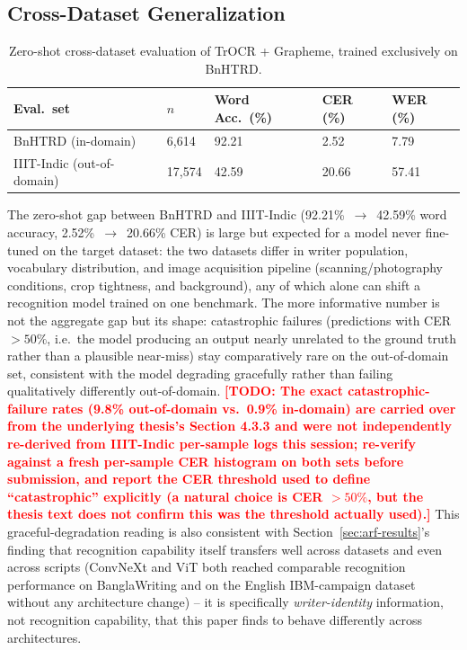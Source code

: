 \documentclass[a4paper,fleqn]{cas-dc}
\newcommand{\todo}[1]{\textcolor{red}{\textbf{[TODO: #1]}}}
\begin{document}
\subsection{Cross-Dataset Generalization}
\label{sec:cross-dataset}

\begin{table}[h]
\caption{Zero-shot cross-dataset evaluation of TrOCR + Grapheme, trained
exclusively on BnHTRD.}
\label{tab:cross-dataset}
\begin{tabular*}{\tblwidth}{@{}LLLLL@{}}
\toprule
Eval.\ set & $n$ & Word Acc.\ (\%) & CER (\%) & WER (\%) \\
\midrule
BnHTRD (in-domain) & 6{,}614 & 92.21 & 2.52 & 7.79 \\
IIIT-Indic (out-of-domain) & 17{,}574 & 42.59 & 20.66 & 57.41 \\
\bottomrule
\end{tabular*}
\end{table}

The zero-shot gap between BnHTRD and IIIT-Indic (92.21\%~$\to$~42.59\%
word accuracy, 2.52\%~$\to$~20.66\% CER) is large but expected for a model
never fine-tuned on the target dataset: the two datasets differ in writer
population, vocabulary distribution, and image acquisition pipeline
(scanning/photography conditions, crop tightness, and background), any of
which alone can shift a recognition model trained on one benchmark. The
more informative number is not the aggregate gap but its shape:
catastrophic failures (predictions with CER $>50\%$, i.e.\ the model
producing an output nearly unrelated to the ground truth rather than a
plausible near-miss) stay comparatively rare on the out-of-domain set,
consistent with the model degrading gracefully rather than failing
qualitatively differently out-of-domain. \todo{The exact catastrophic-failure
rates (9.8\% out-of-domain vs.\ 0.9\% in-domain) are carried over from the
underlying thesis's Section 4.3.3 and were not independently re-derived
from IIIT-Indic per-sample logs this session; re-verify against a fresh
per-sample CER histogram on both sets before submission, and report the
CER threshold used to define ``catastrophic'' explicitly (a natural choice
is CER $>50\%$, but the thesis text does not confirm this was the
threshold actually used).} This graceful-degradation reading is also
consistent with Section~\ref{sec:arf-results}'s finding that recognition
capability itself transfers well across datasets and even across
scripts (ConvNeXt and ViT both reached comparable recognition performance
on BanglaWriting and on the English IBM-campaign dataset without any
architecture change) -- it is specifically \emph{writer-identity}
information, not recognition capability, that this paper finds to behave
differently across architectures.
\end{document}
